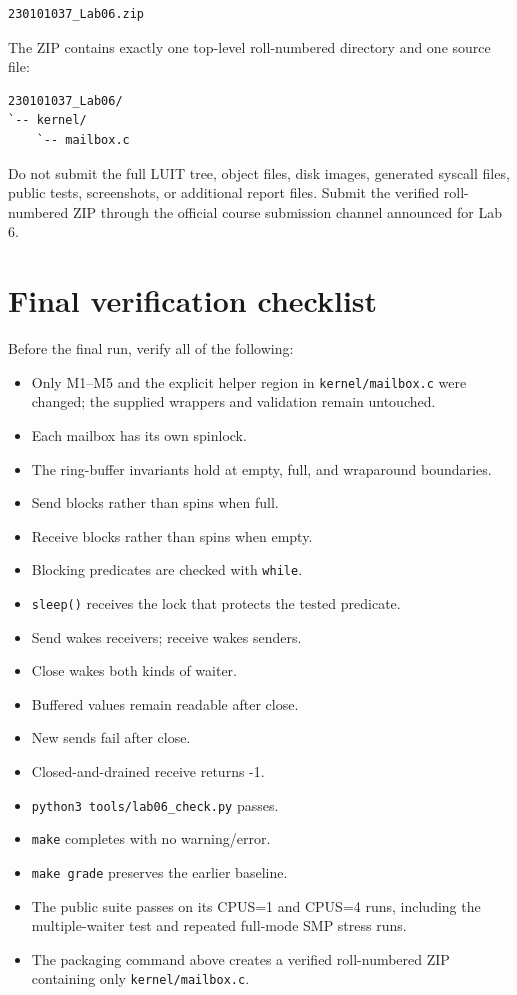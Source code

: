 \documentclass[11pt,a4paper]{article}
\newcommand{\file}[1]{\texttt{#1}}
\begin{document}
\begin{lstlisting}
230101037_Lab06.zip
\end{lstlisting}

The ZIP contains exactly one top-level roll-numbered directory and one source file:

\begin{lstlisting}
230101037_Lab06/
`-- kernel/
    `-- mailbox.c
\end{lstlisting}

Do not submit the full LUIT tree, object files, disk images, generated syscall files, public tests, screenshots, or additional report files. Submit the verified roll-numbered ZIP through the official course submission channel announced for Lab 6.

\section{Final verification checklist}

Before the final run, verify all of the following:

\begin{itemize}[leftmargin=7mm]
\item[$\square$] Only M1--M5 and the explicit helper region in \file{kernel/mailbox.c} were changed; the supplied wrappers and validation remain untouched.
\item[$\square$] Each mailbox has its own spinlock.
\item[$\square$] The ring-buffer invariants hold at empty, full, and wraparound boundaries.
\item[$\square$] Send blocks rather than spins when full.
\item[$\square$] Receive blocks rather than spins when empty.
\item[$\square$] Blocking predicates are checked with \file{while}.
\item[$\square$] \file{sleep()} receives the lock that protects the tested predicate.
\item[$\square$] Send wakes receivers; receive wakes senders.
\item[$\square$] Close wakes both kinds of waiter.
\item[$\square$] Buffered values remain readable after close.
\item[$\square$] New sends fail after close.
\item[$\square$] Closed-and-drained receive returns -1.
\item[$\square$] \file{python3 tools/lab06\_check.py} passes.
\item[$\square$] \file{make} completes with no warning/error.
\item[$\square$] \file{make grade} preserves the earlier baseline.
\item[$\square$] The public suite passes on its CPUS=1 and CPUS=4 runs, including the multiple-waiter test and repeated full-mode SMP stress runs.
\item[$\square$] The packaging command above creates a verified roll-numbered ZIP containing only \file{kernel/mailbox.c}.
\end{itemize}
\end{document}
